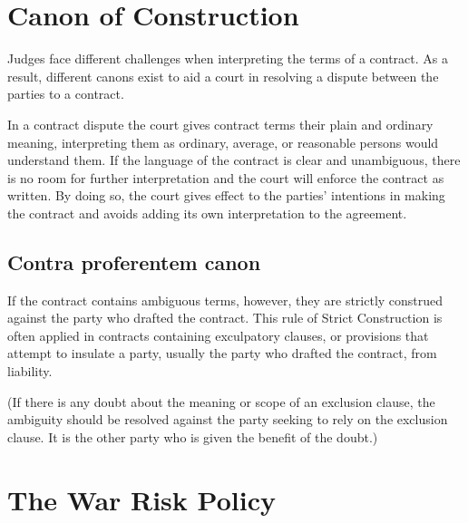 \section{Canon of Construction}




Judges face different challenges when interpreting the terms of a contract. As a result, different canons exist to aid a court in resolving a dispute between the parties to a contract.

In a contract dispute the court gives contract terms their plain and ordinary meaning, interpreting them as ordinary, average, or reasonable persons would understand them. If the language of the contract is clear and unambiguous, there is no room for further interpretation and the court will enforce the contract as written. By doing so, the court gives effect to the parties' intentions in making the contract and avoids adding its own interpretation to the agreement.


\subsection{Contra proferentem canon}
If the contract contains ambiguous terms, however, they are strictly construed against the party who drafted the contract. This rule of Strict Construction is often applied in contracts containing exculpatory clauses, or provisions that attempt to insulate a party, usually the party who drafted the contract, from liability.

(If there is any doubt about the meaning or scope of an exclusion clause, the ambiguity should be resolved against the party seeking to rely on the exclusion clause. It is the other party who is given the benefit of the doubt.)


\section{The War Risk Policy}

